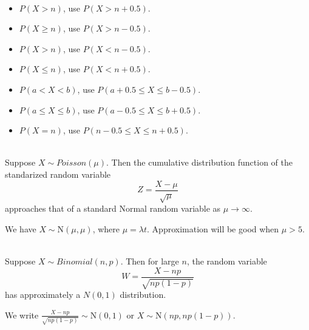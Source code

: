 \begin{proposition}
    \phantom{}\
    \begin{itemize}
        \item $P(X > n)$, use $P(X > n + 0.5)$.
        \item $P(X \geq n)$, use $P(X > n - 0.5)$.
        \item $P(X > n)$, use $P(X < n - 0.5)$.
        \item $P(X \leq n)$, use $P(X < n + 0.5)$.
        \item $P(a < X < b)$, use $P(a + 0.5 \leq X \leq b - 0.5)$.
        \item $P(a \leq X \leq b)$, use $P(a - 0.5 \leq X \leq b + 0.5)$.
        \item $P(X = n)$, use $P(n-0.5 \leq X \leq n + 0.5)$.
    \end{itemize}
\end{proposition}

\begin{theorem}
    \phantom{}  \\
    Suppose $X \sim Poisson(\mu)$. Then the cumulative distribution function of the standarized
    random variable \vspace{-2mm}
    \[Z = \frac{X - \mu}{\sqrt{\mu}}\]
    approaches that of a standard Normal random variable as $\mu \to \infty$.
\end{theorem}

\begin{remark}
    We have $X \sim \text{N}(\mu,\mu)$, where $\mu = \lambda t$. Approximation will be good when $\mu > 5$.
\end{remark}

\begin{theorem}
    \phantom{}  \\
    Suppose $X \sim Binomial(n, p)$. Then for large $n$, the random variable \vspace{-1mm}
    \[W = \frac{X - np}{\sqrt{np(1 - p)}}\]
    has approximately a $N(0, 1)$ distribution.
\end{theorem}

\begin{remark}
    We write $\frac{X - np}{\sqrt{np(1 - p)}} \sim \text{N}(0,1)$ or $X \sim \text{N}(np,np(1-p))$. \vspace{-1mm} \\
\end{remark}


